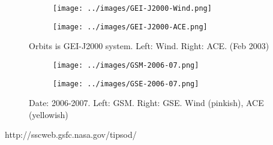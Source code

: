\begin{figure}[h]
  \centering
  \begin{subfigure}[1a]{0.4\textwidth}
    \centering
    \texttt{[image: ../images/GEI-J2000-Wind.png]}
  \end{subfigure}
  \hfill
  \begin{subfigure}[1b]{0.4\textwidth}
    \centering
    \texttt{[image: ../images/GEI-J2000-ACE.png]}
  \end{subfigure}
  \caption{Orbits is GEI-J2000 system. Left: Wind. Right: ACE. (Feb
  2003)}
  \label{fig-gei}
\end{figure}


\begin{figure}[h]
  \centering
  \begin{subfigure}[1a]{0.4\textwidth}
    \centering
    \texttt{[image: ../images/GSM-2006-07.png]}
  \end{subfigure}
  \hfill
  \begin{subfigure}[1b]{0.4\textwidth}
    \centering
    \texttt{[image: ../images/GSE-2006-07.png]}
  \end{subfigure}
  \caption{Date: 2006-2007. Left: GSM. Right: GSE. Wind (pinkish), ACE
  (yellowish)}
  \label{fig-2006-07}
\end{figure}


http://sscweb.gsfc.nasa.gov/tipsod/
